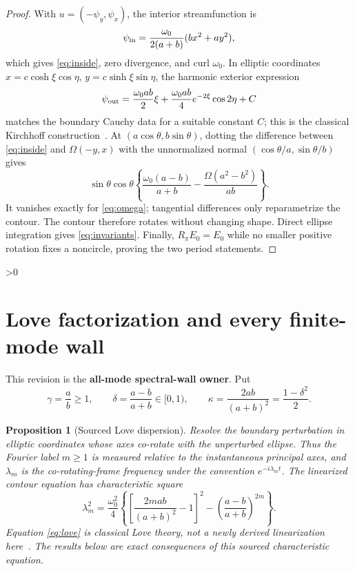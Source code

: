 \documentclass[10pt]{article}
\providecommand{\CRevisionRound}{2}
\newtheorem{proposition}{Proposition}
\begin{document}
\begin{proof}
With $u=(-\psi_y,\psi_x)$, the interior streamfunction is
\[
 \psi_{\rm in}=\frac{\omega_0}{2(a+b)}(bx^2+ay^2),
\]
which gives \eqref{eq:inside}, zero divergence, and curl $\omega_0$.
In elliptic coordinates $x=c\cosh\xi\cos\eta$,
$y=c\sinh\xi\sin\eta$, the harmonic exterior expression
\[
 \psi_{\rm out}=\frac{\omega_0ab}{2}\xi
 +\frac{\omega_0ab}{4}e^{-2\xi}\cos2\eta+C
\]
matches the boundary Cauchy data for a suitable constant $C$; this is the
classical Kirchhoff construction~\cite{MitchellRossi}.
At $(a\cos\theta,b\sin\theta)$, dotting the difference between
\eqref{eq:inside} and $\Omega(-y,x)$ with the unnormalized normal
$(\cos\theta/a,\sin\theta/b)$ gives
\[
 \sin\theta\cos\theta\left\{
 \frac{\omega_0(a-b)}{a+b}
 -\frac{\Omega(a^2-b^2)}{ab}\right\}.
\]
It vanishes exactly for \eqref{eq:omega}; tangential differences only
reparametrize the contour.  The contour therefore rotates without changing
shape.  Direct ellipse integration gives \eqref{eq:invariants}.  Finally,
$R_\pi E_0=E_0$ while no smaller positive rotation fixes a noncircle,
proving the two period statements.
\end{proof}

\ifnum\CRevisionRound>0
\section{Love factorization and every finite-mode wall}
This revision is the \textbf{all-mode spectral-wall owner}.
Put
\begin{equation}\label{eq:variables}
 \gamma=\frac ab\ge1,\qquad
 \delta=\frac{a-b}{a+b}\in[0,1),\qquad
 \kappa=\frac{2ab}{(a+b)^2}=\frac{1-\delta^2}{2}.
\end{equation}

\begin{proposition}[Sourced Love dispersion]\label{prop:love}
Resolve the boundary perturbation in elliptic coordinates whose axes co-rotate
with the unperturbed ellipse.  Thus the Fourier label $m\ge1$ is measured
relative to the instantaneous principal axes, and $\lambda_m$ is the
co-rotating-frame frequency under the convention $e^{-i\lambda_mt}$.  The
linearized contour equation has characteristic square
\begin{equation}\label{eq:love}
 \lambda_m^2=\frac{\omega_0^2}{4}
 \left\{\left[\frac{2mab}{(a+b)^2}-1\right]^2
 -\left(\frac{a-b}{a+b}\right)^{2m}\right\}.
\end{equation}
Equation \eqref{eq:love} is classical Love theory, not a newly derived
linearization here~\cite{Love,MitchellRossi}.  The results below are exact
consequences of this sourced characteristic equation.
\end{proposition}
\end{document}
